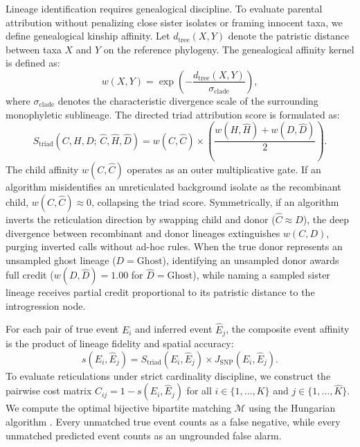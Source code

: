 Lineage identification requires genealogical discipline.
To evaluate parental attribution without penalizing close sister isolates or framing innocent taxa, we define genealogical kinship affinity.
Let $d_{\text{tree}}(X, Y)$ denote the patristic distance between taxa $X$ and $Y$ on the reference phylogeny.
The genealogical affinity kernel is defined as:
\begin{equation}
w(X, Y) = \exp\left(-\frac{d_{\text{tree}}(X, Y)}{\sigma_{\text{clade}}}\right),
\label{eq:methods_patristic_kernel}
\end{equation}
where $\sigma_{\text{clade}}$ denotes the characteristic divergence scale of the surrounding monophyletic sublineage.
The directed triad attribution score is formulated as:
\begin{equation}
S_{\text{triad}}(C, H, D;\, \hat{C}, \hat{H}, \hat{D}) = w(C, \hat{C}) \times \left( \frac{w(H, \hat{H}) + w(D, \hat{D})}{2} \right).
\label{eq:methods_s_triad}
\end{equation}
The child affinity $w(C, \hat{C})$ operates as an outer multiplicative gate.
If an algorithm misidentifies an unreticulated background isolate as the recombinant child, $w(C, \hat{C}) \approx 0$, collapsing the triad score.
Symmetrically, if an algorithm inverts the reticulation direction by swapping child and donor ($\hat{C} \approx D$), the deep divergence between recombinant and donor lineages extinguishes $w(C, D)$, purging inverted calls without ad-hoc rules.
When the true donor represents an unsampled ghost lineage ($D = \text{Ghost}$), identifying an unsampled donor awards full credit ($w(D, \hat{D}) = 1.00$ for $\hat{D} = \text{Ghost}$), while naming a sampled sister lineage receives partial credit proportional to its patristic distance to the introgression node.

For each pair of true event $E_i$ and inferred event $\hat{E}_j$, the composite event affinity is the product of lineage fidelity and spatial accuracy:
\begin{equation}
s(E_i, \hat{E}_j) = S_{\text{triad}}(E_i, \hat{E}_j) \times J_{\text{SNP}}(E_i, \hat{E}_j).
\label{eq:methods_event_affinity}
\end{equation}
To evaluate reticulations under strict cardinality discipline, we construct the pairwise cost matrix $C_{ij} = 1 - s(E_i, \hat{E}_j)$ for all $i \in \{1, \dots, K\}$ and $j \in \{1, \dots, \hat{K}\}$.
We compute the optimal bijective bipartite matching $\mathcal{M}$ using the Hungarian algorithm \citep{kuhn1955hungarian}.
Every unmatched true event counts as a false negative, while every unmatched predicted event counts as an ungrounded false alarm.

